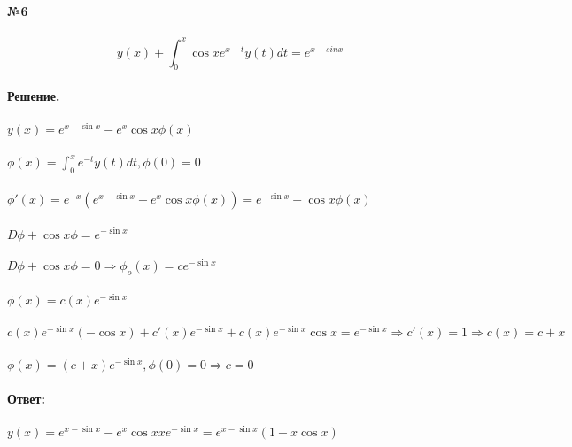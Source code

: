 \documentclass[10pt,a4paper]{article}
\begin{document}
	\noindent\textbf{№6} \\ \\
	$$y(x) + \int_0^x \cos x e^{x-t} y(t) dt = e^{x - sin x}$$ \\
	\textbf{Решение.}\\\\
	$y(x) = e^{x-\sin x} - e^x \cos x \phi (x)$\\ \\
	$\phi (x) = \int_0^x e^{-t} y(t) dt, \phi (0) = 0$\\ \\
	$\phi'(x) = e^{-x} ( e^{x - \sin x} - e^x \cos x \phi (x)) = e^{-\sin x} - \cos x \phi (x)$\\ \\
	$D\phi+\cos x\phi=e^{-\sin x}$\\ \\
	$D\phi+\cos x \phi=0 \Rightarrow \phi_{o} (x)=c e^{-\sin x}$\\ \\
	$\phi(x)=c(x) e^{-\sin x}$\\ \\
	$c(x) e^{-\sin x} (-\cos x) + c'(x) e^{-\sin x} + c(x) e^{-\sin x} \cos x = e^{-\sin x} \Rightarrow c'(x) = 1 \Rightarrow c(x)=c+x$\\ \\
	$\phi(x)=(c+x) e^{-\sin x}, \phi(0)=0 \Rightarrow c=0$\\ \\
	\textbf{Ответ:} \\ \\
	$y(x)=e^{x-\sin x}-e^x \cos x x e^{-\sin x} = e^{x-\sin x}(1-x\cos x)$\\ \\
 
\end{document}
